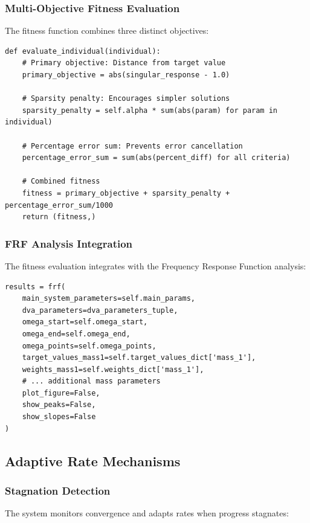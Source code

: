 \documentclass[12pt,a4paper]{article}
\begin{document}
\subsubsection{Multi-Objective Fitness Evaluation}
The fitness function combines three distinct objectives:

\begin{lstlisting}[caption=Fitness Function Components]
def evaluate_individual(individual):
    # Primary objective: Distance from target value
    primary_objective = abs(singular_response - 1.0)
    
    # Sparsity penalty: Encourages simpler solutions
    sparsity_penalty = self.alpha * sum(abs(param) for param in individual)
    
    # Percentage error sum: Prevents error cancellation
    percentage_error_sum = sum(abs(percent_diff) for all criteria)
    
    # Combined fitness
    fitness = primary_objective + sparsity_penalty + percentage_error_sum/1000
    return (fitness,)
\end{lstlisting}

\subsubsection{FRF Analysis Integration}
The fitness evaluation integrates with the Frequency Response Function analysis:

\begin{lstlisting}[caption=FRF Analysis Integration]
results = frf(
    main_system_parameters=self.main_params,
    dva_parameters=dva_parameters_tuple,
    omega_start=self.omega_start,
    omega_end=self.omega_end,
    omega_points=self.omega_points,
    target_values_mass1=self.target_values_dict['mass_1'],
    weights_mass1=self.weights_dict['mass_1'],
    # ... additional mass parameters
    plot_figure=False,
    show_peaks=False,
    show_slopes=False
)
\end{lstlisting}

\subsection{Adaptive Rate Mechanisms}

\subsubsection{Stagnation Detection}
The system monitors convergence and adapts rates when progress stagnates:
\end{document}
